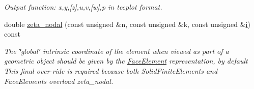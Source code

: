 \begin{DoxyCompactItemize}
\begin{DoxyCompactList}\small\item\em Output function\+: x,y,\mbox{[}z\mbox{]},u,v,\mbox{[}w\mbox{]},p in tecplot format. \end{DoxyCompactList}\item 
double \hyperlink{classoomph_1_1ImposeImpenetrabilityElement_acd1ef4e239729447691ba0b973e395ae}{zeta\+\_\+nodal} (const unsigned \&n, const unsigned \&k, const unsigned \&\hyperlink{cfortran_8h_adb50e893b86b3e55e751a42eab3cba82}{i}) const
\begin{DoxyCompactList}\small\item\em The \char`\"{}global\char`\"{} intrinsic coordinate of the element when viewed as part of a geometric object should be given by the \hyperlink{classoomph_1_1FaceElement}{Face\+Element} representation, by default This final over-\/ride is required because both Solid\+Finite\+Elements and Face\+Elements overload zeta\+\_\+nodal. \end{DoxyCompactList}\end{DoxyCompactItemize}
